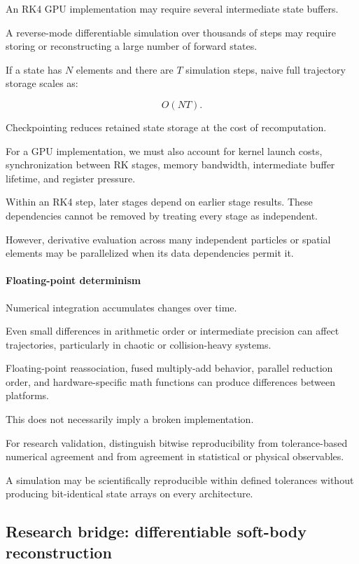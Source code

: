 An RK4 GPU implementation may require several intermediate state buffers.

A reverse-mode differentiable simulation over thousands of steps may require storing or reconstructing a large number of forward states.

If a state has \(N\) elements and there are \(T\) simulation steps, naive full trajectory storage scales as:

\[
O(NT).
\]

Checkpointing reduces retained state storage at the cost of recomputation.

For a GPU implementation, we must also account for kernel launch costs, synchronization between RK stages, memory bandwidth, intermediate buffer lifetime, and register pressure.

Within an RK4 step, later stages depend on earlier stage results. These dependencies cannot be removed by treating every stage as independent.

However, derivative evaluation across many independent particles or spatial elements may be parallelized when its data dependencies permit it.

\paragraph{Floating-point determinism}\label{02-foundations-ii-ch022-floating-point-determinism}

Numerical integration accumulates changes over time.

Even small differences in arithmetic order or intermediate precision can affect trajectories, particularly in chaotic or collision-heavy systems.

Floating-point reassociation, fused multiply-add behavior, parallel reduction order, and hardware-specific math functions can produce differences between platforms.

This does not necessarily imply a broken implementation.

For research validation, distinguish bitwise reproducibility from tolerance-based numerical agreement and from agreement in statistical or physical observables.

A simulation may be scientifically reproducible within defined tolerances without producing bit-identical state arrays on every architecture.

\subsection{Research bridge: differentiable soft-body reconstruction}\label{02-foundations-ii-ch022-research-bridge-differentiable-soft-body-reconstruction}


